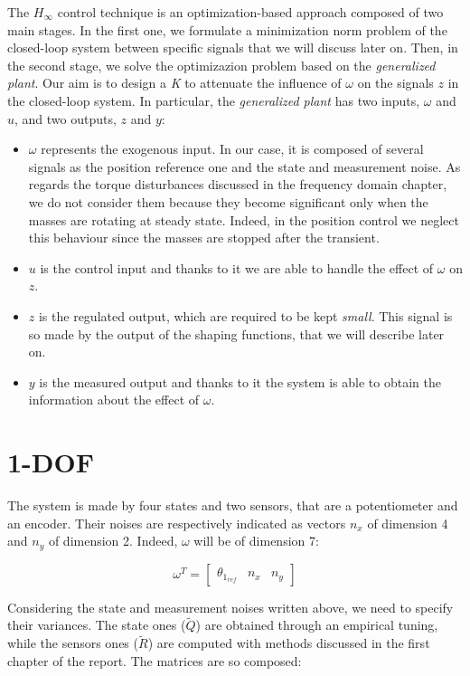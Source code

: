 The ${H_{\infty}}$ control technique is an optimization-based approach composed of two main stages. In the first one, we formulate a minimization norm problem of the closed-loop system between specific signals that we will discuss later on. Then, in the second stage, we solve the optimizazion problem based on the \textit{generalized plant}.
\newline
Our aim is to design a \textit{K} to attenuate the influence of $\omega$ on the signals $z$ in the closed-loop system. In particular, the \textit{generalized plant} has two inputs, $\omega$ and $u$, and two outputs, $z$ and $y$:
\begin{itemize}
	\item \boldmath$\omega$ represents the exogenous input. In our case, it is composed of several signals as the position reference one and the state and measurement noise. As regards the torque disturbances discussed in the frequency domain chapter, we do not consider them because they become significant only when the masses are rotating at steady state. Indeed, in the position control we neglect this behaviour since the masses are stopped after the transient.
	\item \boldmath$u$ is the control input and thanks to it we are able to handle the effect of $\omega$ on $z$.
	\item \boldmath$z$ is the regulated output, which are required to be kept \textit{small}. This signal is so made by the output of the shaping functions, that we will describe later on.
	\item \boldmath$y$ is the measured output and thanks to it the system is able to obtain the information about the effect of $\omega$.
\end{itemize}

\section{1-DOF }
The system is made by four states and two sensors, that are a potentiometer and an encoder. Their noises are respectively indicated as vectors $n_x$ of dimension 4 and $n_y$ of dimension 2. Indeed, $\omega$ will be of dimension 7:

\begin{equation}
	\omega^{T} =
	\begin{bmatrix}
		\theta_{1_{ref}} & n_x & n_y
	\end{bmatrix}
\end{equation}

Considering the state and measurement noises written above, we need to specify their variances. The state ones ($\tilde{Q}$) are obtained through an empirical tuning, while the sensors ones ($\tilde{R}$) are computed with methods discussed in the first chapter of the report. The matrices are so composed:

